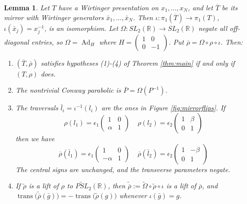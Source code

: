 \documentclass{article}
\newcommand{\Ad}{\operatorname{Ad}}
\theoremstyle{plain}
\theoremstyle{definition}
\theoremstyle{plain}
\theoremstyle{plain}
\theoremstyle{plain}
\newtheorem{lemma}[theorem]{Lemma}
\theoremstyle{remark}
\theoremstyle{remark}
\theoremstyle{plain}
\theoremstyle{plain}
\newcounter{main}
\theoremstyle{plain}
\theoremstyle{plain}
\begin{document}
\begin{lemma}\label{lma:mirror-transfer}
Let $T$ have a Wirtinger presentation on $x_1, \dots, x_N$, and let $\overline{T}$ be its mirror with Wirtinger generators $\bar x_1, \dots, \bar x_N$. Then $\iota: \pi_1(\overline{T}) \to \pi_1(T)$, $\iota(\bar x_j) = x_j^{-1}$, is an isomorphism. Let $\Omega: SL_2(\mathbb R) \to SL_2(\mathbb R)$ negate all off-diagonal entries, so $\Omega = \Ad_H$ where $H = \left(\begin{smallmatrix}1&0\\0&-1\end{smallmatrix}\right)$. Put $\overline\rho = \Omega\circ\rho\circ\iota$. Then:
\begin{enumerate}
	\item $(\overline T, \overline\rho)$ satisfies hypotheses (1)-(4) of Theorem \ref{thm:main} if and only if $(T, \rho)$ does. 
	\item The nontrivial Conway parabolic is $\overline P = \Omega(P^{-1})$. 
	\item The traversals $\bar l_i = \iota^{-1}(l_i)$ are the ones in Figure \ref{fig:mirrorflips}. If
	\begin{equation*}
		\rho(l_1) = \epsilon_1\begin{pmatrix}1 & 0 \\ \alpha & 1\end{pmatrix} \ \ \ \ \ \rho(l_2) = \epsilon_2\begin{pmatrix}1 & \beta \\ 0 & 1\end{pmatrix}
	\end{equation*}
	then we have 
	\begin{equation*}
		\overline\rho(\bar l_1) = \epsilon_1\begin{pmatrix}1 & 0 \\ -\alpha & 1\end{pmatrix} \ \ \ \ \ \overline\rho(\bar l_2) = \epsilon_2\begin{pmatrix}1 & -\beta \\ 0 & 1\end{pmatrix}
	\end{equation*}
	The central signs are unchanged, and the transverse parameters negate.
	\item If $\widetilde\rho$ is a lift of $\rho$ to $\widetilde{PSL}_2(\mathbb R)$, then $\widetilde{\overline\rho} := \widetilde\Omega\circ\widetilde\rho\circ\iota$ is a lift of $\overline\rho$, and $\operatorname{trans}\bigl(\widetilde{\overline\rho}(\bar g)\bigr) = -\operatorname{trans}\bigl(\widetilde\rho(g)\bigr)$ whenever $\iota(\bar g) = g$.
\end{enumerate}
\end{lemma}
\end{document}
